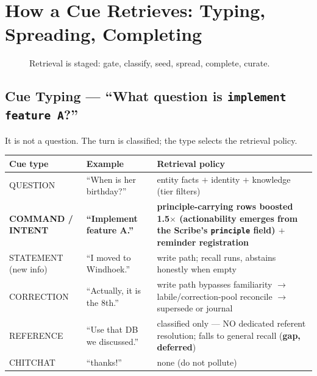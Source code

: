 \section{How a Cue Retrieves: Typing, Spreading, Completing}
\begin{figure}[H]
\centering
{}
\caption{Retrieval is staged: gate, classify, seed, spread, complete, curate.}
\end{figure}

\subsection{Cue Typing --- ``What question is \texttt{implement feature A}?''}
It is not a question. The turn is classified; the type selects the retrieval policy.
\begin{longtable}{@{}p{}p{}p{}@{}}
\toprule
Cue type & Example & Retrieval policy \\
\midrule
QUESTION & ``When is her birthday?'' & entity facts $+$ identity $+$ knowledge (tier filters) \\
\textbf{COMMAND / INTENT} & \textbf{``Implement feature A.''} & \textbf{principle-carrying rows boosted 1.5$\times$ (actionability emerges from the Scribe's \texttt{principle} field) $+$ reminder registration} \\
STATEMENT (new info) & ``I moved to Windhoek.'' & write path; recall runs, abstains honestly when empty \\
CORRECTION & ``Actually, it is the 8th.'' & write path bypasses familiarity $\rightarrow$ labile/correction-pool reconcile $\rightarrow$ supersede or journal \\
REFERENCE & ``Use that DB we discussed.'' & classified only --- NO dedicated referent resolution; falls to general recall (\textbf{gap, deferred}) \\
CHITCHAT & ``thanks!'' & none (do not pollute) \\
\bottomrule
\end{longtable}

